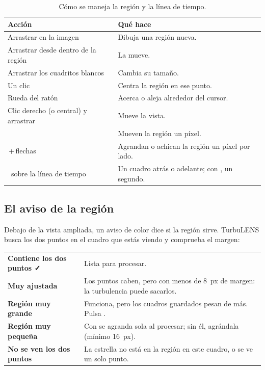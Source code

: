 \begin{table}[H]
\centering\small
\begin{tabularx}{\linewidth}{@{}l Y@{}}
\toprule
Acción & Qué hace\\
\midrule
Arrastrar en la imagen & Dibuja una región nueva.\\
Arrastrar desde dentro de la región & La mueve.\\
Arrastrar los cuadritos blancos & Cambia su tamaño.\\
Un clic & Centra la región en ese punto.\\
Rueda del ratón & Acerca o aleja alrededor del cursor.\\
Clic derecho (o central) y arrastrar & Mueve la vista.\\
 & Mueven la región un píxel.\\
\,+\,flechas & Agrandan o achican la región un píxel por lado.\\
\, sobre la línea de tiempo & Un cuadro atrás o adelante; con , un segundo.\\
\bottomrule
\end{tabularx}
\caption{Cómo se maneja la región y la línea de tiempo.}\label{tab:region}
\end{table}

\subsection{El aviso de la región}

Debajo de la vista ampliada, un aviso de color dice si la región sirve. TurbuLENS busca los dos puntos en el cuadro que
estás viendo y comprueba el margen:

\begin{center}\small
\begin{tabularx}{\linewidth}{@{}>{\color{acento}\bfseries}l Y@{}}
Contiene los dos puntos ✓ & Lista para procesar.\\
\textcolor{cobre}{Muy ajustada} & Los puntos caben, pero con menos de 8~px de margen: la turbulencia puede sacarlos.\\
\textcolor{cobre}{Región muy grande} & Funciona, pero los cuadros guardados pesan de más. Pulsa .\\
\textcolor{cobre}{Región muy pequeña} & Con  se agranda sola al procesar; sin él, agrándala
(mínimo 16~px).\\
\textcolor{red!70!black}{No se ven los dos puntos} & La estrella no está en la región en este cuadro, o se ve un solo punto.\\
\end{tabularx}
\end{center}

